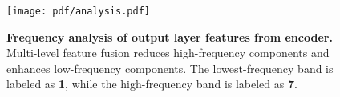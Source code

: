 \begin{figure}[t!]
\centering
\texttt{[image: pdf/analysis.pdf]}
\caption{\textbf{Frequency analysis of output layer features from encoder.} Multi-level feature fusion reduces high-frequency components and enhances low-frequency components. The lowest-frequency band is labeled as \textbf{1}, while the high-frequency band is labeled as \textbf{7}.}
\label{fig:last_layer_freq}
\end{figure}
